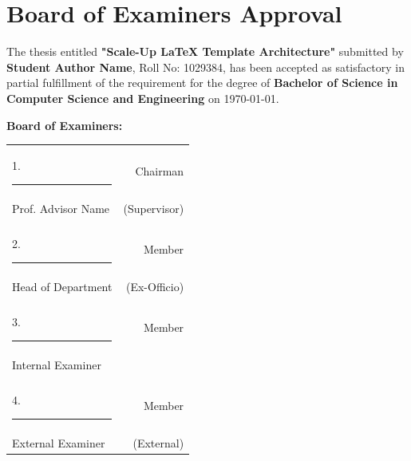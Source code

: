\chapter*{Board of Examiners Approval}
The thesis entitled \textbf{"Scale-Up LaTeX Template Architecture"} submitted by \textbf{Student Author Name}, Roll No: 1029384, has been accepted as satisfactory in partial fulfillment of the requirement for the degree of \textbf{Bachelor of Science in Computer Science and Engineering} on \today.

\vspace{1.5cm}
\noindent
\textbf{Board of Examiners:}

\vspace{1cm}
\noindent
\begin{tabular*}{\textwidth}{@{\extracolsep{\fill}}lr}
    1. \rule{6cm}{0.5pt} & Chairman \\
    Prof. Advisor Name & (Supervisor) \\
    \\
    2. \rule{6cm}{0.5pt} & Member \\
    Head of Department & (Ex-Officio) \\
    \\
    3. \rule{6cm}{0.5pt} & Member \\
    Internal Examiner & \\
    \\
    4. \rule{6cm}{0.5pt} & Member \\
    External Examiner & (External)
\end{tabular*}
